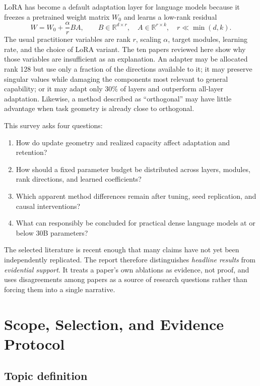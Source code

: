 \documentclass[11pt]{article}
\newcommand{\R}{\mathbb{R}}
\begin{document}
LoRA has become a default adaptation layer for language models because it freezes a pretrained weight matrix $W_0$ and learns a low-rank residual
\begin{equation}
W = W_0 + \frac{\alpha}{r}BA,
\qquad
B\in\R^{d\times r},\quad A\in\R^{r\times k},\quad r\ll\min(d,k).
\label{eq:lora}
\end{equation}
The usual practitioner variables are rank $r$, scaling $\alpha$, target modules, learning rate, and the choice of LoRA variant. The ten papers reviewed here show why those variables are insufficient as an explanation. An adapter may be allocated rank 128 but use only a fraction of the directions available to it; it may preserve singular values while damaging the components most relevant to general capability; or it may adapt only 30\% of layers and outperform all-layer adaptation. Likewise, a method described as ``orthogonal'' may have little advantage when task geometry is already close to orthogonal.

This survey asks four questions:
\begin{enumerate}[label=\textbf{RQ\arabic*}]
  \item How do update geometry and realized capacity affect adaptation and retention?
  \item How should a fixed parameter budget be distributed across layers, modules, rank directions, and learned coefficients?
  \item Which apparent method differences remain after tuning, seed replication, and causal interventions?
  \item What can responsibly be concluded for practical dense language models at or below 30B parameters?
\end{enumerate}

The selected literature is recent enough that many claims have not yet been independently replicated. The report therefore distinguishes \emph{headline results} from \emph{evidential support}. It treats a paper's own ablations as evidence, not proof, and uses disagreements among papers as a source of research questions rather than forcing them into a single narrative.

\section{Scope, Selection, and Evidence Protocol}

\subsection{Topic definition}
\end{document}
